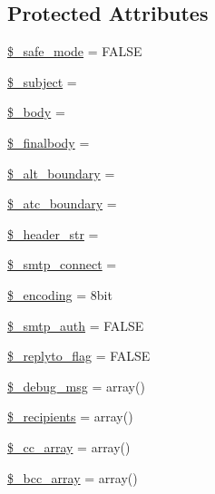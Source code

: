 \subsection*{Protected Attributes}
\begin{DoxyCompactItemize}
\item 
\hyperlink{class_c_i___email_a9f2bbbf11ed324c1744f64d81242e8d5}{\$\+\_\+safe\+\_\+mode} = F\+A\+L\+S\+E
\item 
\hyperlink{class_c_i___email_a3a212566602bb9c1c34e7619390b1bb8}{\$\+\_\+subject} = \textquotesingle{}\textquotesingle{}
\item 
\hyperlink{class_c_i___email_a2428d6733045fa7c07e5f61c8c85b8c9}{\$\+\_\+body} = \textquotesingle{}\textquotesingle{}
\item 
\hyperlink{class_c_i___email_afe3b263ee6d58805f3c06ef1fdc863a5}{\$\+\_\+finalbody} = \textquotesingle{}\textquotesingle{}
\item 
\hyperlink{class_c_i___email_a477272b452ccbf6729c9c804cd35b902}{\$\+\_\+alt\+\_\+boundary} = \textquotesingle{}\textquotesingle{}
\item 
\hyperlink{class_c_i___email_a643faf39316959087e82595b6355f0a0}{\$\+\_\+atc\+\_\+boundary} = \textquotesingle{}\textquotesingle{}
\item 
\hyperlink{class_c_i___email_a551b64b005666b98b001ed7ff405047c}{\$\+\_\+header\+\_\+str} = \textquotesingle{}\textquotesingle{}
\item 
\hyperlink{class_c_i___email_ab15af26ecd0970be1fb7609d06eec5ba}{\$\+\_\+smtp\+\_\+connect} = \textquotesingle{}\textquotesingle{}
\item 
\hyperlink{class_c_i___email_a37d569dfb47810a72ca1cfc5095ad149}{\$\+\_\+encoding} = \textquotesingle{}8bit\textquotesingle{}
\item 
\hyperlink{class_c_i___email_a9b977d5970ceedb6cba44032a9976459}{\$\+\_\+smtp\+\_\+auth} = F\+A\+L\+S\+E
\item 
\hyperlink{class_c_i___email_a00e8e2c2c72e6acf2cd91a8c4498695a}{\$\+\_\+replyto\+\_\+flag} = F\+A\+L\+S\+E
\item 
\hyperlink{class_c_i___email_a23c65b604c773811f76e75093fe9a77b}{\$\+\_\+debug\+\_\+msg} = array()
\item 
\hyperlink{class_c_i___email_aa5f5e78dd9477bdec18b4aadae77ba13}{\$\+\_\+recipients} = array()
\item 
\hyperlink{class_c_i___email_af979b4b8dc11cd847482938c13fd527d}{\$\+\_\+cc\+\_\+array} = array()
\item 
\hyperlink{class_c_i___email_a9e55a2ff848d216fa27361d3c66d979d}{\$\+\_\+bcc\+\_\+array} = array()

\end{DoxyCompactItemize}
